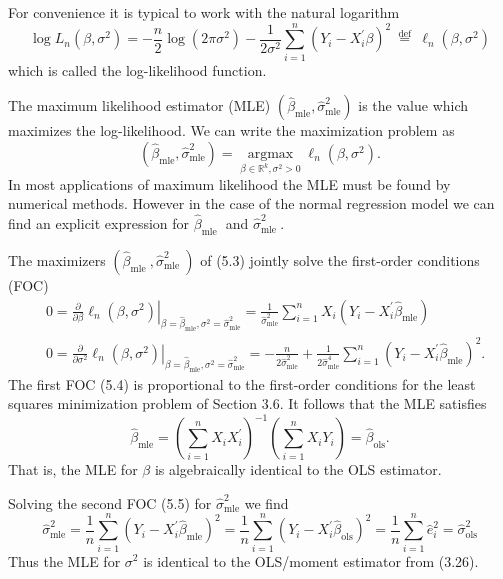\documentclass[10pt]{article}
\begin{document}
For convenience it is typical to work with the natural logarithm
$$
\log L_{n}\left(\beta, \sigma^{2}\right)=-\frac{n}{2} \log \left(2 \pi \sigma^{2}\right)-\frac{1}{2 \sigma^{2}} \sum_{i=1}^{n}\left(Y_{i}-X_{i}^{\prime} \beta\right)^{2} \stackrel{\text { def }}{=} \ell_{n}\left(\beta, \sigma^{2}\right)
$$
which is called the log-likelihood function.

The maximum likelihood estimator (MLE) $\left(\widehat{\beta}_{\mathrm{mle}}, \widehat{\sigma}_{\mathrm{mle}}^{2}\right)$ is the value which maximizes the log-likelihood. We can write the maximization problem as
$$
\left(\widehat{\beta}_{\mathrm{mle}}, \widehat{\sigma}_{\mathrm{mle}}^{2}\right)=\underset{\beta \in \mathbb{R}^{k}, \sigma^{2}>0}{\operatorname{argmax}} \ell_{n}\left(\beta, \sigma^{2}\right) .
$$
In most applications of maximum likelihood the MLE must be found by numerical methods. However in the case of the normal regression model we can find an explicit expression for $\widehat{\beta}_{\text {mle }}$ and $\widehat{\sigma}_{\text {mle }}^{2}$.

The maximizers $\left(\widehat{\beta}_{\text {mle }}, \widehat{\sigma}_{\text {mle }}^{2}\right)$ of (5.3) jointly solve the first-order conditions (FOC)
$$
\begin{aligned}
&0=\left.\frac{\partial}{\partial \beta} \ell_{n}\left(\beta, \sigma^{2}\right)\right|_{\beta=\widehat{\beta}_{\mathrm{mle}}, \sigma^{2}=\widehat{\sigma}_{\mathrm{mle}}^{2}}=\frac{1}{\widehat{\sigma}_{\mathrm{mle}}^{2}} \sum_{i=1}^{n} X_{i}\left(Y_{i}-X_{i}^{\prime} \widehat{\beta}_{\mathrm{mle}}\right) \\
&0=\left.\frac{\partial}{\partial \sigma^{2}} \ell_{n}\left(\beta, \sigma^{2}\right)\right|_{\beta=\widehat{\beta}_{\mathrm{mle}}, \sigma^{2}=\widehat{\sigma}_{\mathrm{mle}}^{2}}=-\frac{n}{2 \widehat{\sigma}_{\mathrm{mle}}^{2}}+\frac{1}{2 \widehat{\sigma}_{\mathrm{mle}}^{4}} \sum_{i=1}^{n}\left(Y_{i}-X_{i}^{\prime} \widehat{\beta}_{\mathrm{mle}}\right)^{2} .
\end{aligned}
$$
The first FOC (5.4) is proportional to the first-order conditions for the least squares minimization problem of Section 3.6. It follows that the MLE satisfies
$$
\widehat{\beta}_{\mathrm{mle}}=\left(\sum_{i=1}^{n} X_{i} X_{i}^{\prime}\right)^{-1}\left(\sum_{i=1}^{n} X_{i} Y_{i}\right)=\widehat{\beta}_{\mathrm{ols}} .
$$
That is, the MLE for $\beta$ is algebraically identical to the OLS estimator.

Solving the second FOC (5.5) for $\widehat{\sigma}_{\mathrm{mle}}^{2}$ we find
$$
\widehat{\sigma}_{\mathrm{mle}}^{2}=\frac{1}{n} \sum_{i=1}^{n}\left(Y_{i}-X_{i}^{\prime} \widehat{\beta}_{\mathrm{mle}}\right)^{2}=\frac{1}{n} \sum_{i=1}^{n}\left(Y_{i}-X_{i}^{\prime} \widehat{\beta}_{\mathrm{ols}}\right)^{2}=\frac{1}{n} \sum_{i=1}^{n} \widehat{e}_{i}^{2}=\widehat{\sigma}_{\mathrm{ols}}^{2}
$$
Thus the MLE for $\sigma^{2}$ is identical to the OLS/moment estimator from (3.26).
\end{document}
